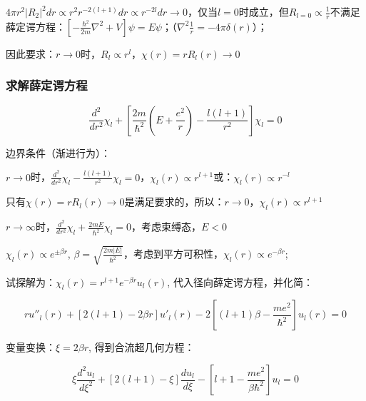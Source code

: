 $4\pi r^2 \left| {R_2 } \right|^2 dr \propto r^2 r^{ - 2(l + 1)} dr \propto r^{ - 2l} dr \to 0$，仅当$l = 0$时成立，但$R_{l = 0}  \propto \frac{1}{r}$不满足薛定谔方程：$\left[ { - \frac{{\hbar ^2 }}{{2m}}\nabla ^2  + V} \right]\psi  = E\psi $；（$\nabla ^2 \frac{1}{r} =  - 4\pi \delta \left( r \right)$）；

因此要求：$r \to 0$时，$R_l  \propto r^l $，$\chi (r) = rR_l (r) \to 0$



\subsubsection{求解薛定谔方程}

\begin{equation}\label{15-10}
\frac{{d^2 }}{{dr^2 }}\chi _l  + \left[ {\frac{{2m}}{{\hbar ^2 }}\left( {E + \frac{{e^2 }}{r}} \right) - \frac{{l\left( {l + 1} \right)}}{{r^2 }}} \right]\chi _l  = 0
\end{equation}

边界条件（渐进行为）：

$r \to 0$时，$\frac{{d^2 }}{{dr^2 }}\chi _l  - \frac{{l\left( {l + 1} \right)}}{{r^2 }}\chi _l  = 0$，$\chi _l (r) \propto r^{l + 1} $或：$\chi _l (r) \propto r^{ - l} $

只有$\chi (r) = rR_l (r) \to 0$是满足要求的，所以：$r \to 0$，$\chi _l (r) \propto r^{l + 1} $

$r \to \infty $时，$\frac{{d^2 }}{{dr^2 }}\chi _l  + \frac{{2mE}}{{\hbar ^2 }}\chi _l  = 0$，考虑束缚态，$E<0$

$\chi _l (r) \propto e^{ \pm \beta r} $, $\beta  = \sqrt {\frac{{2m\left| E \right|}}{{\hbar ^2 }}} $，考虑到平方可积性，$\chi _l (r) \propto e^{ - \beta r} $;

试探解为：$\chi _l (r) = r^{l + 1} e^{ - \beta r} u_l (r)$, 代入径向薛定谔方程，并化简：


\begin{equation}\label{15-11}
ru''_l (r) + \left[ {2\left( {l + 1} \right) - 2\beta r} \right]u'_l (r) - 2\left[ {\left( {l + 1} \right)\beta  - \frac{{me^2 }}{{\hbar ^2 }}} \right]u_l (r) = 0
\end{equation}

变量变换：$\xi  = 2\beta r$, 得到合流超几何方程：

\begin{equation}\label{15-12}
\xi \frac{{d^2 u_l }}{{d\xi ^2 }} + \left[ {2(l + 1) - \xi } \right]\frac{{du_l }}{{d\xi }} - \left[ {l + 1 - \frac{{me^2 }}{{\beta \hbar ^2 }}} \right]u_l  = 0
\end{equation}

